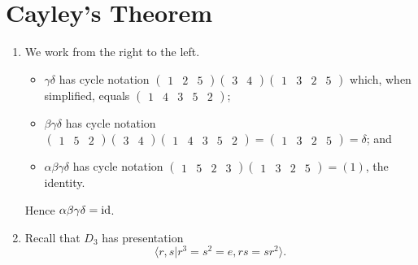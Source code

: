\section{Cayley's Theorem}
\begin{enumerate}
    \item We work from the right to the left.
    \begin{itemize}
        \item $\gamma \delta$ has cycle notation $\begin{pmatrix}1 & 2 & 5\end{pmatrix}\begin{pmatrix}3 & 4\end{pmatrix}\begin{pmatrix}1 & 3 & 2 & 5\end{pmatrix}$ which, when simplified, equals $\begin{pmatrix}1 & 4 & 3 & 5 & 2\end{pmatrix}$;
        \item $\beta \gamma \delta$ has cycle notation $\begin{pmatrix}1 & 5 & 2\end{pmatrix}\begin{pmatrix}3 & 4\end{pmatrix}\begin{pmatrix}1 & 4 & 3 & 5 & 2\end{pmatrix} = \begin{pmatrix}1 & 3 & 2 & 5\end{pmatrix} = \delta$; and
        \item $\alpha \beta \gamma \delta$ has cycle notation $\begin{pmatrix}1 & 5 & 2 & 3\end{pmatrix}\begin{pmatrix}1 & 3 & 2 & 5\end{pmatrix} = (1)$, the identity.
    \end{itemize}
    Hence $\alpha \beta \gamma \delta = \mathrm{id}$.

    \item Recall that $D_3$ has presentation
    \[
        \langle r, s \vert r^3 = s^2 = e, rs = sr^2 \rangle.
    \]


\end{enumerate}
